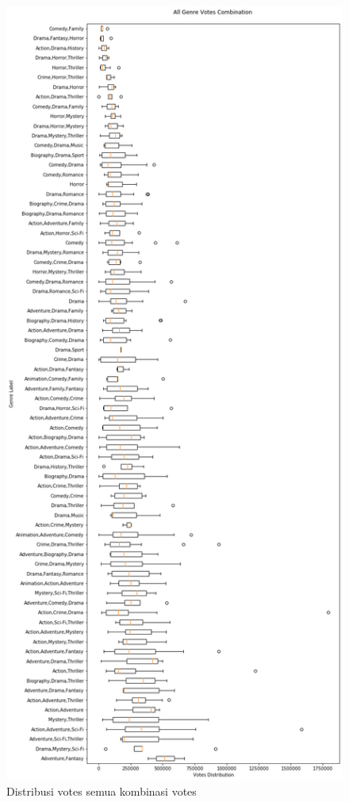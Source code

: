 \begin{figure}[H]
	\centering  
	\includegraphics[scale=0.4]{./Lampiran/gambar/all_genre_multiboxplotbyvotes}   
	\caption{Distribusi votes semua kombinasi votes}
	\label{fig:all_genre_multiboxplotbyvotes} 
\end{figure} 


